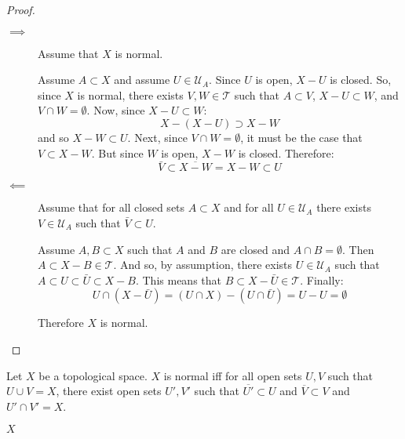 \documentclass[letterpaper,12pt,fleqn]{article}
\newcommand{\T}{\mathscr{T}}
\newcommand{\U}{\mathcal{U}}
\begin{document}
\begin{proof}
  \begin{description}
  \item[]
  \item[\(\implies\)] Assume that \(X\) is normal.

    Assume \(A\subset X\) and assume \(U\in\U_A\).  Since \(U\) is open, \(X-U\) is closed.  So, since \(X\) is
    normal, there exists \(V,W\in\T\) such that \(A\subset V\), \(X-U\subset W\), and \(V\cap W=\emptyset\).
    Now, since \(X-U\subset W\):
    \[X-(X-U)\supset X-W\]
    and so \(X-W\subset U\).  Next, since \(V\cap W=\emptyset\), it must be the case that \(V\subset X-W\).  But
    since \(W\) is open, \(X-W\) is closed.  Therefore:
    \[\bar{V}\subset\overline{X-W}=X-W\subset U\]

  \item[\(\impliedby\)] Assume that for all closed sets \(A\subset X\) and for all \(U\in\U_A\)
    there exists \(V\in\U_A\) such that \(\bar{V}\subset U\).

    Assume \(A,B\subset X\) such that \(A\) and \(B\) are closed and \(A\cap B=\emptyset\).
    Then \(A\subset X-B\in\T\).  And so, by assumption, there exists \(U\in\U_A\) such that
    \(A\subset U\subset\bar{U}\subset X-B\).  This means that \(B\subset X-\bar{U}\in\T\).  Finally:
    \[U\cap(X-\bar{U})=(U\cap X)-(U\cap\bar{U})=U-U=\emptyset\]

    Therefore \(X\) is normal.
  \end{description}
\end{proof}

\begin{theorem}
  Let \(X\) be a topological space.  \(X\) is normal iff for all open sets \(U,V\) such that \(U\cup V=X\), there
  exist open sets \(U',V'\) such that \(\overline{U'}\subset U\) and \(\overline{V}\subset V\) and \(U'\cap V'=X\).
\end{theorem}

\begin{center}

  \(X\)
\end{center}
\end{document}
